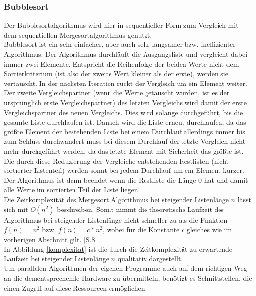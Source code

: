 \subsubsection{Bubblesort}\label{bubblesort}
Der Bubblesortalgorithmus wird hier in sequentieller Form zum Vergleich mit dem sequentiellen Mergesortalgorithmus genutzt.\\
Bubblesort ist ein sehr einfacher, aber auch sehr langsamer bzw. ineffizienter Algorithmus.
Der Algorithmus durchläuft die Ausgangsliste und vergleicht dabei immer zwei Elemente. Entspricht die Reihenfolge der beiden Werte nicht dem Sortierkriterium (ist also der zweite Wert kleiner als der erste), werden sie vertauscht. In der nächsten Iteration rückt der Vergleich um ein Element weiter. Der zweite Vergleichspartner (wenn die Werte getauscht wurden, ist es der ursprünglich erste Vergleichspartner) des letzten Vergleichs wird damit der erste Vergleichspartner des neuen Vergleichs. Dies wird solange durchgeführt, bis die gesamte Liste durchlaufen ist. Danach wird die Liste erneut durchlaufen, da das größte Element der bestehenden Liste bei einem Durchlauf allerdings immer bis zum Schluss \glqq durchwandert\grqq{} muss bei diesem Durchlauf der letzte Vergleich nicht mehr durchgeführt werden, da das letzte Element mit Sicherheit das größte ist. Die durch diese Reduzierung der Vergleiche entstehenden \glqq Restlisten\grqq{} (nicht sortierter Listenteil) werden somit bei jedem Durchlauf um ein Element kürzer. Der Algorithmus ist dann beendet wenn die \glqq Restliste\grqq{} die Länge 0 hat und damit alle Werte im sortierten Teil der Liste liegen.\\
Die Zeitkomplexität des Mergesort Algorithmus bei steigender Listenlänge $n$ lässt sich mit \mbox{$O(n^2)$} beschreiben. Somit nimmt die theoretische Laufzeit des Algorithmus bei steigender Listenlänge nicht schneller zu als die Funktion \mbox{$f(n)=n^2$} bzw. \mbox{$f(n)=c*n^2$}, wobei für die Konstante $c$ gleiches wie im vorherigen Abschnitt gilt. \cite{Schallehn_Grundlagen_der_Informatik}[S.8]\\[0.25 cm]
In Abbildung \ref{komplexitat} ist die durch die Zeitkomplexität zu erwartende Laufzeit bei steigender Listenlänge $n$ qualitativ dargestellt.\\[0.5 cm]
Um parallelen Algorithmen der eigenen Programme auch auf dem richtigen Weg an die dementsprechende Hardware zu übermitteln, benötigt es Schnittstellen, die einen Zugriff auf diese Ressourcen ermöglichen.

